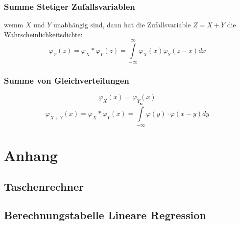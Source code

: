 \documentclass[margin=normal]{tex/hsrzf}
\begin{document}
\begin{multicols}{2}
\subsubsection*{Summe Stetiger Zufallsvariablen}
wemm $X$ und $Y$ unabhängig sind, dann hat die Zufallsvariable $Z = X + Y$ die Wahrscheinlichkeitsdichte:
$$\varphi_Z(z) = \varphi_X * \varphi_Y(z) = \int \limits _{-\infty} ^{\infty}  \varphi_X(x) \varphi_Y(z-x)dx$$

\subsubsection*{Summe von Gleichverteilungen}
$$\varphi_X(x) = \varphi_Y(x)$$
$$\varphi_{X+Y}(x) = \varphi_X * \varphi_Y(x) = \int \limits _{-\infty} ^{\infty} \varphi(y)\cdot \varphi(x-y)dy $$
\end{multicols}


\section{Anhang}

\subsection{Taschenrechner}

\newpage
\subsection{Berechnungstabelle Lineare Regression}
\end{document}
